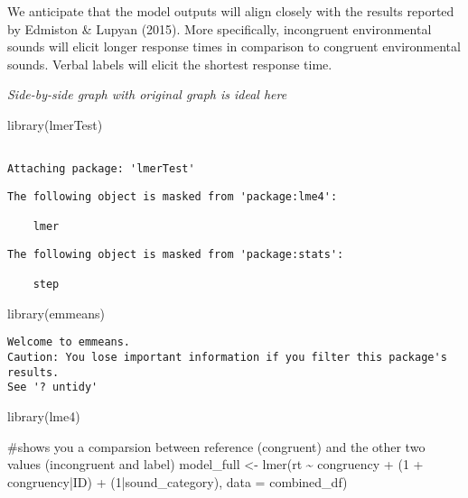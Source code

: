 \documentclass[
  letterpaper,
  DIV=11,
  numbers=noendperiod]{scrartcl}
\newenvironment{Shaded}{\begin{snugshade}}{\end{snugshade}}
\newcommand{\AttributeTok}[1]{\textcolor[rgb]{0.40,0.45,0.13}{#1}}
\newcommand{\CommentTok}[1]{\textcolor[rgb]{0.37,0.37,0.37}{#1}}
\newcommand{\DecValTok}[1]{\textcolor[rgb]{0.68,0.00,0.00}{#1}}
\newcommand{\FunctionTok}[1]{\textcolor[rgb]{0.28,0.35,0.67}{#1}}
\newcommand{\NormalTok}[1]{\textcolor[rgb]{0.00,0.23,0.31}{#1}}
\newcommand{\OtherTok}[1]{\textcolor[rgb]{0.00,0.23,0.31}{#1}}
\newcommand{\SpecialCharTok}[1]{\textcolor[rgb]{0.37,0.37,0.37}{#1}}
\begin{document}
We anticipate that the model outputs will align closely with the results
reported by Edmiston \& Lupyan (2015). More specifically, incongruent
environmental sounds will elicit longer response times in comparison to
congruent environmental sounds. Verbal labels will elicit the shortest
response time.

\emph{Side-by-side graph with original graph is ideal here}

\begin{Shaded}
\begin{Highlighting}[]
\FunctionTok{library}\NormalTok{(lmerTest)}
\end{Highlighting}
\end{Shaded}

\begin{verbatim}

Attaching package: 'lmerTest'
\end{verbatim}

\begin{verbatim}
The following object is masked from 'package:lme4':

    lmer
\end{verbatim}

\begin{verbatim}
The following object is masked from 'package:stats':

    step
\end{verbatim}

\begin{Shaded}
\begin{Highlighting}[]
\FunctionTok{library}\NormalTok{(emmeans)}
\end{Highlighting}
\end{Shaded}

\begin{verbatim}
Welcome to emmeans.
Caution: You lose important information if you filter this package's results.
See '? untidy'
\end{verbatim}

\begin{Shaded}
\begin{Highlighting}[]
\FunctionTok{library}\NormalTok{(lme4)}

\CommentTok{\#shows you a comparsion between reference (congruent) and the other two values (incongruent and label)}
\NormalTok{model\_full }\OtherTok{\textless{}{-}} \FunctionTok{lmer}\NormalTok{(rt }\SpecialCharTok{\textasciitilde{}}\NormalTok{ congruency }\SpecialCharTok{+}\NormalTok{ (}\DecValTok{1} \SpecialCharTok{+}\NormalTok{ congruency}\SpecialCharTok{|}\NormalTok{ID) }\SpecialCharTok{+}\NormalTok{ (}\DecValTok{1}\SpecialCharTok{|}\NormalTok{sound\_category), }\AttributeTok{data =}\NormalTok{ combined\_df)}
\end{Highlighting}
\end{Shaded}
\end{document}
